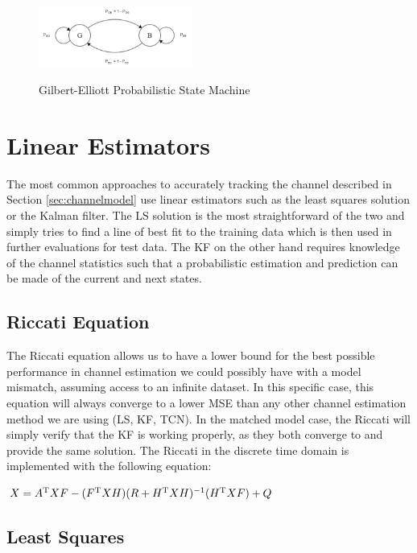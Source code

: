 \documentclass[twocolumn,letterpaper]{IEEEAerospaceCLS}  %
\begin{document}
\begin{figure}[!h]
\centering\includegraphics[width=0.45\textwidth]{figs/GBmodel.PNG}\\
\caption{Gilbert-Elliott Probabilistic State Machine}
\label{gbe}
\end{figure}

\section{Linear Estimators}
\label{sec:linest}

The most common approaches to accurately tracking the channel described in Section \ref{sec:channelmodel} use linear estimators such as the least squares solution or the Kalman filter. The LS solution is the most straightforward of the two and simply tries to find a line of best fit to the training data which is then used in further evaluations for test data. The KF on the other hand requires knowledge of the channel statistics such that a probabilistic estimation and prediction can be made of the current and next states. 

\subsection{Riccati Equation}

The Riccati equation allows us to have a lower bound for the best possible performance in channel estimation we could possibly have with a model mismatch, assuming access to an infinite dataset. In this specific case, this equation will always converge to a lower MSE than any other channel estimation method we are using (LS, KF, TCN). In the matched model case, the Riccati will simply verify that the KF is working properly, as they both converge to and provide the same solution. The Riccati in the discrete time domain is implemented with the following equation: 

$X=A^{\rm T}XF-(F^{\rm T}XH)(R+H^{\rm T}XH)^{-1}(H^{\rm T}XF) + Q $

\subsection{Least Squares}
\end{document}
